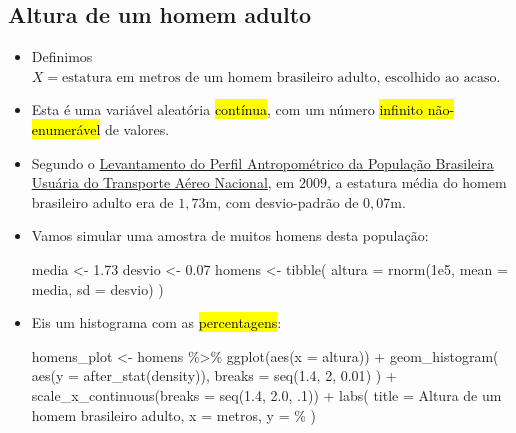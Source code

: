 \documentclass[
  11pt]{report}
\newenvironment{Shaded}{\begin{snugshade}}{\end{snugshade}}
\newcommand{\AttributeTok}[1]{\textcolor[rgb]{0.77,0.63,0.00}{#1}}
\newcommand{\DecValTok}[1]{\textcolor[rgb]{0.00,0.00,0.81}{#1}}
\newcommand{\FloatTok}[1]{\textcolor[rgb]{0.00,0.00,0.81}{#1}}
\newcommand{\FunctionTok}[1]{\textcolor[rgb]{0.00,0.00,0.00}{#1}}
\newcommand{\NormalTok}[1]{#1}
\newcommand{\OtherTok}[1]{\textcolor[rgb]{0.56,0.35,0.01}{#1}}
\newcommand{\SpecialCharTok}[1]{\textcolor[rgb]{0.00,0.00,0.00}{#1}}
\newcommand{\StringTok}[1]{\textcolor[rgb]{0.31,0.60,0.02}{#1}}
\renewenvironment{Shaded}{
    \begin{mdframed}[%
      roundcorner=2pt,%
      innerleftmargin=5pt,%
      innerrightmargin=5pt,%
      topline=true,%
      leftline=true,%
      rightline=true,%
      bottomline=true,%
      linewidth=0.5pt,%
      linecolor=black!20,%
      backgroundcolor=black!2,%
      skipabove=2ex,%
      skipbelow=2.5ex%
    ]%
  }
  {
    \end{mdframed}
  }
\begin{document}
\hypertarget{altura-de-um-homem-adulto}{%
\subsection{Altura de um homem adulto}\label{altura-de-um-homem-adulto}}

\begin{itemize}
\item
  Definimos $X = \text{estatura em metros de um homem brasileiro adulto, escolhido ao acaso}$.
\item
  Esta é uma variável aleatória {\hl{contínua}}, com um número {\hl{infinito não-enumerável}} de valores.
\item
  Segundo o \href{https://pdf4pro.com/view/levantamento-do-perfil-antropom-201-trico-10652c.html}{Levantamento do Perfil Antropométrico da População Brasileira Usuária do Transporte Aéreo Nacional}, em $2009$, a estatura média do homem brasileiro adulto era de $1{,}73$m, com desvio-padrão de $0{,}07$m.
\item
  Vamos simular uma amostra de muitos homens desta população:

\begin{Shaded}
\begin{Highlighting}[]
\NormalTok{media }\OtherTok{\textless{}{-}} \FloatTok{1.73}
\NormalTok{desvio }\OtherTok{\textless{}{-}} \FloatTok{0.07}
\NormalTok{homens }\OtherTok{\textless{}{-}} \FunctionTok{tibble}\NormalTok{(}
  \AttributeTok{altura =} \FunctionTok{rnorm}\NormalTok{(}\FloatTok{1e5}\NormalTok{, }\AttributeTok{mean =}\NormalTok{ media, }\AttributeTok{sd =}\NormalTok{ desvio)}
\NormalTok{)}
\end{Highlighting}
\end{Shaded}
\item
  Eis um histograma com as {\hl{percentagens}}:

\begin{Shaded}
\begin{Highlighting}[]
\NormalTok{homens\_plot }\OtherTok{\textless{}{-}}\NormalTok{ homens }\SpecialCharTok{\%\textgreater{}\%} 
  \FunctionTok{ggplot}\NormalTok{(}\FunctionTok{aes}\NormalTok{(}\AttributeTok{x =}\NormalTok{ altura)) }\SpecialCharTok{+}
    \FunctionTok{geom\_histogram}\NormalTok{(}
      \FunctionTok{aes}\NormalTok{(}\AttributeTok{y =} \FunctionTok{after\_stat}\NormalTok{(density)),}
      \AttributeTok{breaks =} \FunctionTok{seq}\NormalTok{(}\FloatTok{1.4}\NormalTok{, }\DecValTok{2}\NormalTok{, }\FloatTok{0.01}\NormalTok{)}
\NormalTok{    ) }\SpecialCharTok{+}
    \FunctionTok{scale\_x\_continuous}\NormalTok{(}\AttributeTok{breaks =} \FunctionTok{seq}\NormalTok{(}\FloatTok{1.4}\NormalTok{, }\FloatTok{2.0}\NormalTok{, .}\DecValTok{1}\NormalTok{)) }\SpecialCharTok{+}
    \FunctionTok{labs}\NormalTok{(}
      \AttributeTok{title =} \StringTok{\textquotesingle{}Altura de um homem brasileiro adulto\textquotesingle{}}\NormalTok{,}
      \AttributeTok{x =} \StringTok{\textquotesingle{}metros\textquotesingle{}}\NormalTok{,}
      \AttributeTok{y =} \StringTok{\textquotesingle{}\%\textquotesingle{}}
\NormalTok{    )}


\end{Highlighting}
\end{Shaded}
\end{itemize}
\end{document}
